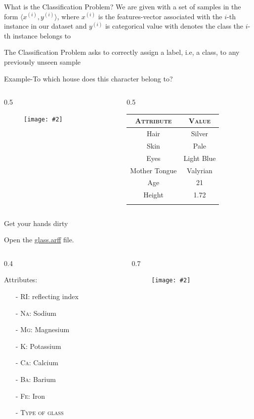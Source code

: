 \documentclass{beamer}
\newcommand{\cblue}[1]{{\usebeamercolor[fg]{structure} #1}}
\newcommand{\sample}[2]{#1^{(#2)}}
\newcommand{\cols}[4]{
	\begin{columns}[t]
	\begin{column}{#1\textwidth}
		#3
	\end{column}
	\begin{column}{#2\textwidth}
		#4
	\end{column}
	\end{columns}
	
}
\newcommand{\fig}[2]{
	\begin{figure}[!h]
	\texttt{[image: \#2]}
	\end{figure}
}
\begin{document}
 
\begin{frame}[noframenumbering]{What is the Classification Problem?}
We are given with a set of samples in the form $\langle \sample{x}{i}, \sample{y}{i} \rangle$, where $\sample{x}{i}$ is the features-vector
associated with the $i$-th instance in our dataset and $\sample{y}{i}$ is
categorical value with denotes the class the $i$-th instance belongs to
\vskip 10pt
\begin{mdframed}[backgroundcolor=blue!30] 
The Classification Problem asks to correctly assign a label, i.e, a class, to
any previously unseen sample
\end{mdframed}

\vspace{0.5cm}
\cblue{\textsf{Example}}-To which house does this character belong to?
\cols{0.5}{0.5}{
\fig{0.7}{img/dany.jpg}
}
{
\begin{table}
\begin{tabular}{c|c}
\textsc{Attribute} & \textsc{Value} \\
\hline
 Hair & Silver \\
 Skin & Pale \\
 Eyes & Light Blue \\
 Mother Tongue & Valyrian \\
 Age & 21 \\
 Height & 1.72 \\
 \hline 
\color{red}{House} & \color{red}{\textbf{Targaryen}} \\
 \hline
\end{tabular}
\end{table}
}
\end{frame}
 
 
 
 
\begin{frame}[t]{Get your hands dirty}

Open the \underline{\textsf{glass.arff}} file.
\cols{0.4}{0.7}{

Attributes:
\begin{itemize}
\item[-] \textsc{RI}: reflecting index
\item[-] \textsc{Na}: Sodium
\item[-] \textsc{Mg}: Magnesium
\item[-] \textsc{K}: Potassium
\item[-] \textsc{Ca}: Calcium
\item[-] \textsc{Ba}: Barium
\item[-] \textsc{Fe}: Iron
\item[-] \textsc{Type of glass}
\end{itemize}
}{
\fig{0.2}{img/glass.png}
}
\end{frame}
\end{document}
